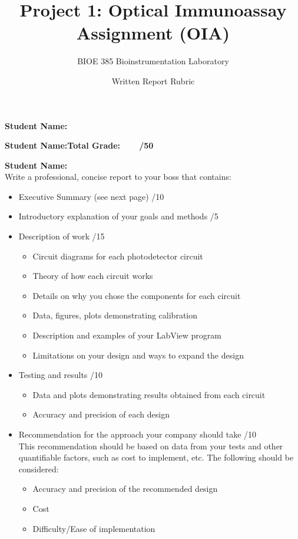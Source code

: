 \documentclass{article}
\title{Project 1: Optical Immunoassay Assignment (OIA)}
\author{BIOE 385 Bioinstrumentation Laboratory}
\date{Written Report Rubric}
\begin{document}
\large
\maketitle

\textbf{Student Name:}\vspace{0.5cm}

\textbf{Student Name:}\hfill 	\textbf{Total Grade:\ \ \ \ \underline{\hspace{1cm}}/50}\vspace{0.5cm}

\textbf{Student Name:}\hfill\\

Write a professional, concise report to your boss that contains:
\begin{itemize}
	\item Executive Summary (see next page) \hfill \underline{\hspace{1cm}}/10
	\item Introductory explanation of your goals and methods \hfill \underline{\hspace{1cm}}/5
	\item Description of work \hfill \underline{\hspace{1cm}}/15
		\begin{itemize}
			\item Circuit diagrams for each photodetector circuit
			\item Theory of how each circuit works
			\item Details on why you chose the components for each circuit
			\item Data, figures, plots demonstrating calibration
			\item Description and examples of your LabView program
			\item Limitations on your design and ways to expand the design
		\end{itemize}
	\item Testing and results \hfill \underline{\hspace{1cm}}/10
		\begin{itemize}
			\item Data and plots demonstrating results obtained from each circuit
			\item Accuracy and precision of each design
		\end{itemize}
	\item Recommendation for the approach your company should take \hfill \underline{\hspace{1cm}}/10\\
		This recommendation should be based on data from your tests and other quantifiable factors, such as cost to implement, etc. The following should be considered:
		\begin{itemize}
			\item Accuracy and precision of the recommended design
			\item Cost
			\item Difficulty/Ease of implementation
		\end{itemize}
\end{itemize}
\end{document}
